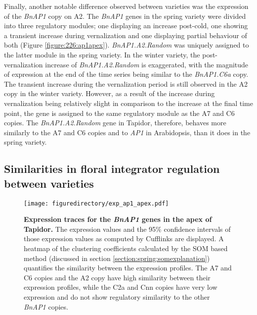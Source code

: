 \documentclass[12pt,]{book}
\begin{document}
Finally, another notable difference observed between varieties was the
expression of the \emph{BnAP1} copy on A2. The \emph{BnAP1} genes in the
spring variety were divided into three regulatory modules; one
displaying an increase post-cold, one showing a transient increase
during vernalization and one displaying partial behaviour of both
(Figure \ref{figure:226:ap1apex}). \emph{BnAP1.A2.Random} was uniquely
assigned to the latter module in the spring variety. In the winter
variety, the post-vernalization increase of \emph{BnAP1.A2.Random} is
exaggerated, with the magnitude of expression at the end of the time
series being similar to the \emph{BnAP1.C6a} copy. The transient
increase during the vernalization period is still observed in the A2
copy in the winter variety. However, as a result of the increase during
vernalization being relatively slight in comparison to the increase at
the final time point, the gene is assigned to the same regulatory module
as the A7 and C6 copies. The \emph{BnAP1.A2.Random} gene in Tapidor,
therefore, behaves more similarly to the A7 and C6 copies and to
\emph{AP1} in Arabidopsis, than it does in the spring variety.

\subsection{Similarities in floral integrator regulation between
varieties}\label{section:winter:floralsimilarities}

\begin{figure}[htbp]
\centering
\texttt{[image: figuredirectory/exp\_ap1\_apex.pdf]}
\caption{\textbf{Expression traces for the \emph{BnAP1} genes in the
apex of Tapidor.} The expression values and the 95\% confidence
intervals of those expression values as computed by Cufflinks are
displayed. A heatmap of the clustering coefficients calculated by the
SOM based method (discussed in section
\ref{section:spring:somexplanation}) quantifies the similarity between
the expression profiles. The A7 and C6 copies and the A2 copy have high
similarity between their expression profiles, while the C2a and Cnn
copies have very low expression and do not show regulatory similarity to
the other \emph{BnAP1} copies.}\label{figure:3xx:ap1apex}
\end{figure}
\end{document}
